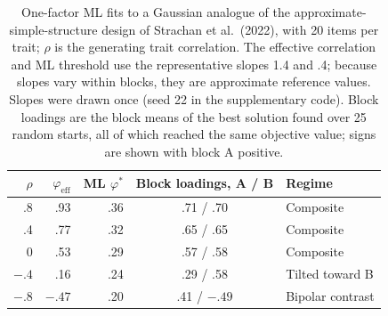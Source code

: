 \begin{table}[t]
\centering\small
\caption{One-factor ML fits to a Gaussian analogue of the approximate-simple-structure design of Strachan et al.\ (2022), with 20 items per trait; $\rho$ is the generating trait correlation. The effective correlation and ML threshold use the representative slopes 1.4 and .4; because slopes vary within blocks, they are approximate reference values. Slopes were drawn once (seed 22 in the supplementary code). Block loadings are the block means of the best solution found over 25 random starts, all of which reached the same objective value; signs are shown with block A positive.}
\label{tab:crossloading-illustration}
\begin{tabular}{rrrcl}
\toprule
$\rho$ & $\varphi_{\mathrm{eff}}$ & ML $\varphi^*$ & Block loadings, A / B & Regime \\
\midrule
.8 & .93 & .36 & .71 / .70 & Composite \\
.4 & .77 & .32 & .65 / .65 & Composite \\
0 & .53 & .29 & .57 / .58 & Composite \\
$-.4$ & .16 & .24 & .29 / .58 & Tilted toward B \\
$-.8$ & $-.47$ & .20 & .41 / $-.49$ & Bipolar contrast \\
\bottomrule
\end{tabular}
\end{table}
